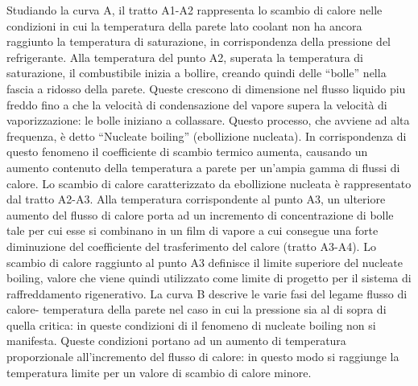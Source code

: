 Studiando la curva A, il tratto A1-A2 rappresenta lo scambio di calore nelle condizioni in cui la temperatura della parete lato coolant non ha ancora raggiunto la temperatura di saturazione, in corrispondenza della pressione del refrigerante. Alla temperatura del punto A2, superata la temperatura di saturazione, il combustibile inizia a bollire, creando quindi delle “bolle” nella fascia a ridosso della parete. Queste crescono di dimensione nel flusso liquido piu freddo fino a che la velocità di condensazione del vapore supera la velocità di vaporizzazione: le bolle iniziano a collassare. Questo processo, che avviene ad alta frequenza, è detto “Nucleate boiling” (ebollizione nucleata). In corrispondenza di questo fenomeno il coefficiente di scambio termico aumenta, causando un aumento contenuto della temperatura a parete per un'ampia gamma di flussi di calore. Lo scambio di calore caratterizzato da ebollizione nucleata è rappresentato dal tratto A2-A3. Alla temperatura corrispondente al punto A3, un ulteriore aumento del flusso di calore porta ad un incremento di concentrazione di bolle tale per cui esse si combinano in un film di vapore a cui consegue una forte diminuzione del coefficiente del trasferimento del calore (tratto A3-A4). Lo scambio di calore raggiunto al punto A3 definisce il limite superiore del nucleate boiling, valore che viene quindi utilizzato come limite di progetto per il sistema di raffreddamento rigenerativo.
La curva B descrive le varie fasi del legame flusso di calore- temperatura della parete nel caso in cui la pressione sia al di sopra di quella critica: in queste condizioni di il fenomeno di nucleate boiling non si manifesta. Queste condizioni portano ad un aumento di temperatura proporzionale all'incremento del flusso di calore: in questo modo si raggiunge la temperatura limite per un valore di scambio di calore minore.